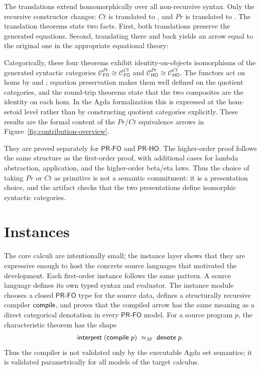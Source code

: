 \documentclass[sigplan,10pt,anonymous,review,screen]{acmart}
\newcommand{\PRFO}{\ensuremath{\mathsf{PR\mbox{-}FO}}}
\newcommand{\PRHO}{\ensuremath{\mathsf{PR\mbox{-}HO}}}
\begin{document}
The translations extend homomorphically over all non-recursive syntax.
Only the recursive constructor changes: \(Ct\) is translated to
, and \(Pr\) is translated to .  The
translation theorems state two facts.  First, both translations preserve
the generated equations.  Second, translating there and back yields an
arrow equal to the original one in the appropriate equational theory:

{\small
\CorePRFOParamorphismCatamorphismEquivalence*
}

Categorically, these four theorems exhibit identity-on-objects
isomorphisms of the generated syntactic categories
\(\mathcal{C}_{\mathsf{FO}}^{Pr} \cong
\mathcal{C}_{\mathsf{FO}}^{Ct}\) and
\(\mathcal{C}_{\mathsf{HO}}^{Pr} \cong
\mathcal{C}_{\mathsf{HO}}^{Ct}\).  The functors act on homs by
 and ; equation preservation makes
them well defined on the quotient categories, and the round-trip
theorems state that the two composites are the identity on each hom.  In
the Agda formalization this is expressed at the hom-setoid level rather
than by constructing quotient categories explicitly.  These results are
the formal content of the \(Pr/Ct\) equivalence arrows in
Figure~\ref{fig:contribution-overview}.

They are proved separately for \PRFO{} and \PRHO{}.  The higher-order
proof follows the same structure as the first-order proof, with
additional cases for lambda abstraction, application, and the
higher-order beta/eta laws.  Thus the choice of taking \(Pr\) or \(Ct\)
as primitive is not a semantic commitment: it is a presentation choice,
and the artifact checks that the two presentations define isomorphic
syntactic categories.

\section{Instances}
\label{sec:instances}

The core calculi are intentionally small; the instance layer shows that
they are expressive enough to host the concrete source languages that
motivated the development.  Each first-order instance follows the same
pattern.  A source language defines its own typed syntax and evaluator.
The instance module chooses a closed \PRFO{} type for the source data,
defines a structurally recursive compiler
\(\AgdaFunction{compile}\), and proves that the compiled arrow has the
same meaning as a direct categorical denotation in every \PRFO{} model.
For a source program \(p\), the characteristic theorem has the shape
\begin{equation}
\label{eq:instance-preservation}
  \AgdaFunction{interpret}\;(\AgdaFunction{compile}\;p)
  \;\approx_M\;
  \AgdaFunction{denote}\;p .
\end{equation}
Thus the compiler is not validated only by the executable Agda set
semantics; it is validated parametrically for all models of the target
calculus.
\end{document}
